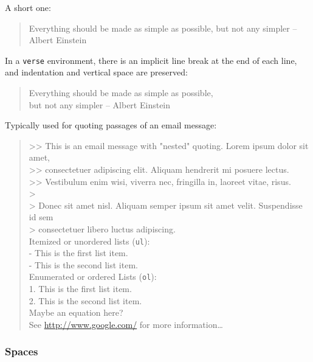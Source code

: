 \documentclass[11pt]{article}
\begin{document}
A short one:

\begin{quote}
Everything should be made as simple as possible,
but not any simpler -- Albert Einstein
\end{quote}

In a \texttt{verse} environment, there is an implicit line break at the end of each
line, and indentation and vertical space are preserved:

\begin{verse}
Everything should be made as simple as possible,\\[0pt]
but not any simpler -- Albert Einstein\\[0pt]
\end{verse}

Typically used for quoting passages of an email message:

\begin{verse}
>> This is an email message with "nested" quoting. Lorem ipsum dolor sit amet,\\[0pt]
>> consectetuer adipiscing elit. Aliquam hendrerit mi posuere lectus.\\[0pt]
>> Vestibulum enim wisi, viverra nec, fringilla in, laoreet vitae, risus.\\[0pt]
>\\[0pt]
> Donec sit amet nisl. Aliquam semper ipsum sit amet velit. Suspendisse id sem\\[0pt]
> consectetuer libero luctus adipiscing.\\[0pt]
\vspace*{1em}
Itemized or unordered lists (\texttt{ul}):\\[0pt]
- This is the first list item.\\[0pt]
- This is the second list item.\\[0pt]
\vspace*{1em}
Enumerated or ordered Lists (\texttt{ol}):\\[0pt]
1. This is the first list item.\\[0pt]
2. This is the second list item.\\[0pt]
\vspace*{1em}
Maybe an equation here?\\[0pt]
\vspace*{1em}
See \url{http://www.google.com/} for more information\ldots{}\\[0pt]
\end{verse}

\subsubsection*{Spaces}
\label{sec:orga4c2a0e}
\end{document}

